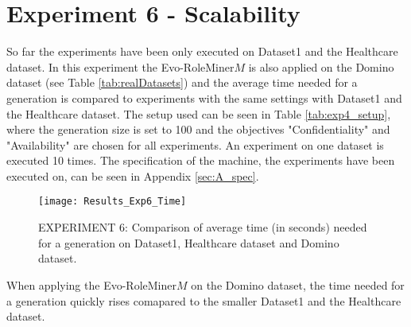 \section{Experiment 6 - Scalability}
\label{sec:exp6}
So far the experiments have been only executed on Dataset1 and the Healthcare dataset. In this experiment the Evo-RoleMiner$M$ is also applied on the Domino dataset (see Table \ref{tab:realDatasets}) and the average time needed for a generation is compared to experiments with the same settings with Dataset1 and the Healthcare dataset. The setup used can be seen in Table \ref{tab:exp4_setup}, where the generation size is set to 100  and the objectives "Confidentiality" and "Availability" are chosen for all experiments. An experiment on one dataset is executed 10 times. The specification of the machine, the experiments have been executed on, can be seen in Appendix \ref{sec:A_spec}.

\begin{figure}[H]
	\centering
	\texttt{[image: Results\_Exp6\_Time]}
	\caption{EXPERIMENT 6: Comparison of average time (in seconds) needed for a generation on Dataset1, Healthcare dataset and Domino dataset.}
	\label{fig:Results_Exp6_Time}
\end{figure}

 When applying the Evo-RoleMiner$M$ on the Domino dataset, the time needed for a generation quickly rises comapared to the smaller Dataset1 and the Healthcare dataset.
